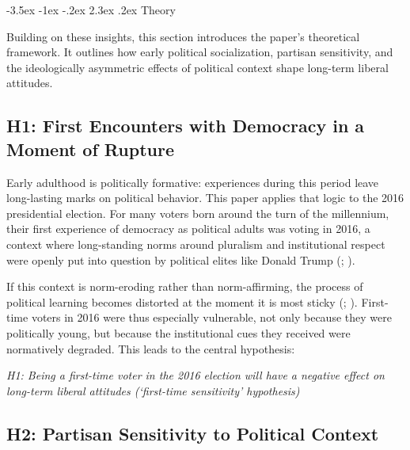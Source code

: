 \documentclass[
  10pt,
  letterpaper,
  DIV=11,
  numbers=noendperiod]{scrartcl}
\makeatletter
\renewcommand\section{\@startsection{section}{1}{\z@}%
  {-3.5ex \@plus -1ex \@minus -.2ex}%
  {2.3ex \@plus.2ex}%
  {\normalfont\Large\bfseries\centering}}
\makeatother
\begin{document}
\newpage{}

\section{Theory}\label{theory}

Building on these insights, this section introduces the paper's
theoretical framework. It outlines how early political socialization,
partisan sensitivity, and the ideologically asymmetric effects of
political context shape long-term liberal attitudes.

\subsection{H1: First Encounters with Democracy in a Moment of
Rupture}\label{h1-first-encounters-with-democracy-in-a-moment-of-rupture}

Early adulthood is politically formative: experiences during this period
leave long-lasting marks on political behavior. This paper applies that
logic to the 2016 presidential election. For many voters born around the
turn of the millennium, their first experience of democracy as political
adults was voting in 2016, a context where long-standing norms around
pluralism and institutional respect were openly put into question by
political elites like Donald Trump (; ).

If this context is norm-eroding rather than norm-affirming, the process
of political learning becomes distorted at the moment it is most sticky
(;
). First-time voters in 2016 were
thus especially vulnerable, not only because they were politically
young, but because the institutional cues they received were normatively
degraded. This leads to the central hypothesis:

\emph{H1: Being a first-time voter in the 2016 election will have a
negative effect on long-term liberal attitudes (`first-time sensitivity'
hypothesis)}

\subsection{H2: Partisan Sensitivity to Political
Context}\label{h2-partisan-sensitivity-to-political-context}
\end{document}
